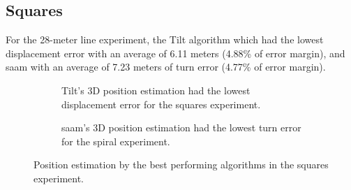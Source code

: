 \newpage

\subsection{Squares}

For the 28-meter line experiment, the Tilt algorithm which had the lowest displacement error with an average of 6.11 meters (4.88\% of error margin), and \acrshort{saam} with an average of 7.23 meters of turn error (4.77\% of error margin).

\vspace{-0.5cm}

\vspace{-1.5cm}

\begin{figure}[H]
    \centering
    \begin{subfigure}{0.49\textwidth}
        \centering
        \resizebox{1\linewidth}{!}{}
        \caption{Tilt's 3D position estimation had the lowest displacement error for the squares experiment.}
        \label{fig:squares2D}
    \end{subfigure}
    \begin{subfigure}{0.49\textwidth}
        \centering
        \resizebox{1\linewidth}{!}{}
        \caption{\acrshort{saam}'s 3D position estimation had the lowest turn error for the spiral experiment.}
        \label{fig:squares3D}
    \end{subfigure}
    \caption{Position estimation by the best performing algorithms in the squares experiment.}
    \label{fig:squares}
\end{figure}

